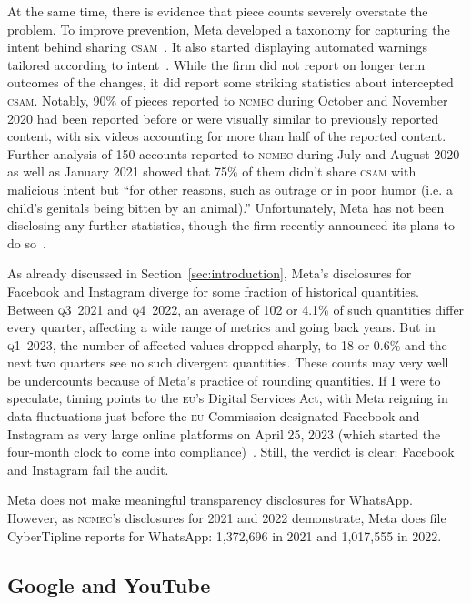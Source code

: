 \documentclass[nonacm,screen]{acmart}
\newcommand\V[1]{\textsc{\MakeLowercase{#1}}}
\begin{document}
At the same time, there is evidence that piece counts severely overstate the
problem. To improve prevention, Meta developed a taxonomy for capturing the
intent behind sharing \V{CSAM}~\cite{BuckleyAndrusea2021}. It also started
displaying automated warnings tailored according to intent~\cite{Davis2021}.
While the firm did not report on longer term outcomes of the changes, it did
report some striking statistics about intercepted \V{CSAM}. Notably, 90\% of
pieces reported to \V{NCMEC} during October and November 2020 had been reported
before or were visually similar to previously reported content, with six videos
accounting for more than half of the reported content. Further analysis of 150
accounts reported to \V{NCMEC} during July and August 2020 as well as January
2021 showed that 75\% of them didn't share \V{CSAM} with malicious intent but
``for other reasons, such as outrage or in poor humor (i.e. a child's genitals
being bitten by an animal).'' Unfortunately, Meta has not been disclosing any
further statistics, though the firm recently announced its plans to do
so~\cite{Meta2023}.

As already discussed in Section~\ref{sec:introduction}, Meta's disclosures for
Facebook and Instagram diverge for some fraction of historical quantities.
Between \V{Q3}~2021 and \V{Q4}~2022, an average of 102 or 4.1\% of such
quantities differ every quarter, affecting a wide range of metrics and going
back years. But in \V{Q1}~2023, the number of affected values dropped sharply,
to 18 or 0.6\% and the next two quarters see no such divergent quantities. These
counts may very well be undercounts because of Meta's practice of rounding
quantities. If I were to speculate, timing points to the \V{EU}'s Digital
Services Act, with Meta reigning in data fluctuations just before the \V{EU}
Commission designated Facebook and Instagram as very large online platforms on
April 25, 2023 (which started the four-month clock to come into
compliance)~\cite{EuropeanCommission2023a}. Still, the verdict is clear:
Facebook and Instagram fail the audit.

Meta does not make meaningful transparency disclosures for WhatsApp. However, as
\V{NCMEC}'s disclosures for 2021 and 2022 demonstrate, Meta does file
CyberTipline reports for WhatsApp: 1,372,696 in 2021 and 1,017,555 in 2022.


\subsection{Google and YouTube}
\end{document}
